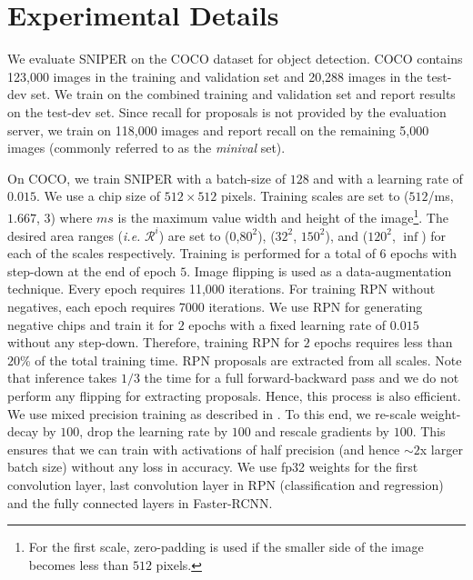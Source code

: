 \documentclass{article}
\begin{document}
\section{Experimental Details}
\label{sec:exp_details}
We evaluate SNIPER on the COCO dataset for object detection. COCO contains 123,000 images in the training and validation set and  20,288 images in the test-dev set. We train on the combined training and validation set and report results on the test-dev set. Since recall for proposals is not provided by the evaluation server, we train on 118,000 images and report recall on the remaining 5,000 images (commonly referred to as the \textit{minival} set). 

On COCO, we train SNIPER with a batch-size of $128$ and with a learning rate of $0.015$. We use a chip size of $512\times512$ pixels. Training scales are set to ($512$/ms, $1.667$, $3$) where $ms$ is the maximum value width and height of the image\footnote{For the first scale, zero-padding is used if the smaller side of the image becomes less than $512$ pixels.}. The desired area ranges (\textit{i.e.} $\mathcal{R}^i$) are set to ($0$,$80^2$), ($32^2$, $150^2$), and ($120^2$, $\inf$) for each of the scales respectively. Training is performed for a total of $6$ epochs with step-down at the end of epoch $5$. Image flipping is used as a data-augmentation technique. Every epoch requires 11,000 iterations. For training RPN without negatives, each epoch requires 7000 iterations. We use RPN for generating negative chips and train it for $2$ epochs with a fixed learning rate of $0.015$ without any step-down. Therefore, training RPN for $2$ epochs requires less than $20$\% of the total training time. RPN proposals are extracted from all scales. Note that inference takes $1/3$ the time for a full forward-backward pass and we do not perform any flipping for extracting proposals. Hence, this process is also efficient. We use mixed precision training as described in \cite{narang2017mixed}. To this end, we re-scale weight-decay by $100$, drop the learning rate by $100$ and rescale gradients by $100$. This ensures that we can train with activations of half precision (and hence $\sim 2$x larger batch size) without any loss in accuracy. We use fp32 weights for the first convolution layer, last convolution layer in RPN (classification and regression) and the fully connected layers in Faster-RCNN. 
\end{document}
